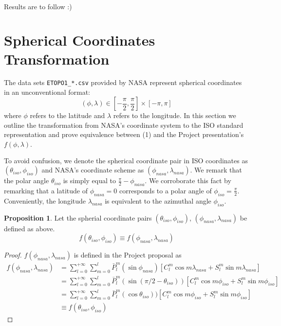 \documentclass[a4paper]{article}
\theoremstyle{definition}
\newtheorem{proposition}{Proposition}
\begin{document}
Results are to follow :)





\appendix
\section{Spherical Coordinates Transformation}

The data sets \verb|ETOPO1_*.csv| provided by NASA represent spherical coordinates in an unconventional format: $$(\phi, \lambda) \in [-\frac{\pi}{2}, \frac{\pi}{2}] \times [-\pi, \pi] $$ where $\phi$ refers to the latitude
and $\lambda$ refers to the longitude. In this section we outline the transformation from NASA's coordinate system to the ISO standard representation and prove equivalence between (1) and the Project presentation's $f(\phi, \lambda)$.

To avoid confusion, we denote the spherical coordinate pair in ISO coordinates as $(\theta_{iso}, \phi_{iso})$ and NASA's coordinate scheme as $(\phi_{nasa}, \lambda_{nasa})$.
We remark that the polar angle $\theta_{iso}$ is simply equal to $\frac{\pi}{2} - \phi_{nasa}$. We corroborate this fact by remarking that a latitude of $\phi_{nasa} = 0$ corresponds to a polar
angle of $\phi_{iso} = \frac{\pi}{2}$. Conveniently, the longitude $\lambda_{nasa}$ is equivalent to the azimuthal angle $\phi_{iso}$.

\begin{proposition} Let the spherial coordinate pairs $(\theta_{iso}, \phi_{iso})$, $(\phi_{nasa}, \lambda_{nasa})$ be defined as above. 
    \begin{equation*}
        f(\theta_{iso}, \phi_{iso}) \equiv f(\phi_{nasa}, \lambda_{nasa})
    \end{equation*}

    
\end{proposition}



\begin{proof}
    $f(\phi_{nasa}, \lambda_{nasa})$ is defined in the Project proposal as 
    \begin{align} \label{eq:project_def} 
        f(\phi_{nasa}, \lambda_{nasa}) &= \sum_{l = 0}^{+\infty}\sum_{m = 0}^l \bar P_l^m(\sin\phi_{nasa})[C_l^m\cos m\lambda_{nasa} + S_l^m \sin m \lambda_{nasa}] \\ 
                                       &= \sum_{l = 0}^{+\infty}\sum_{m = 0}^l \bar P_l^m(\sin(\pi/2 - \theta_{iso}))[C_l^m\cos m\phi_{iso} + S_l^m \sin m \phi_{iso}] \\
                                       &= \sum_{l = 0}^{+\infty}\sum_{m = 0}^l \bar P_l^m(\cos\theta_{iso}))[C_l^m\cos m\phi_{iso} + S_l^m \sin m \phi_{iso}] \\
                                       &\equiv f(\theta_{iso}, \phi_{iso})
    \end{align}

\end{proof}

\nocite{*}



\end{document}
